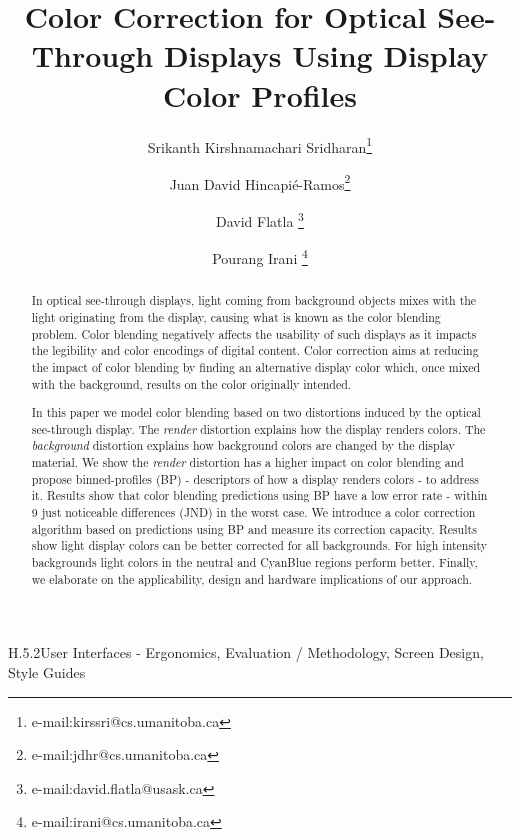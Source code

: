 \documentclass[annual]{acmsiggraph}
\title{Color Correction for Optical See-Through Displays
Using Display Color Profiles}
\author[1]{Srikanth Kirshnamachari Sridharan\thanks{e-mail:kirssri@cs.umanitoba.ca}}
\author[1]{Juan David Hincapi\'{e}-Ramos\thanks{e-mail:jdhr@cs.umanitoba.ca}}
\author[2]{David Flatla \thanks{e-mail:david.flatla@usask.ca}}
\author[1]{Pourang Irani  \thanks{e-mail:irani@cs.umanitoba.ca}}
\affil[1]{Department of Computer Science, Winnipeg, Manitoba, University Of Manitoba}
\affil[2]{Department of Computer Science, Saskatoon, Saskatchewan, University Of Saskatchewan}
\begin{document}

\maketitle

\begin{abstract}
In optical see-through displays, light coming from background objects mixes with the light originating from the display, causing what is known as the color blending problem. Color blending negatively affects the usability of such displays as it impacts the legibility and color encodings of digital content. Color correction aims at reducing the impact of color blending by finding an alternative display color which, once mixed with the background, results on the color originally intended.

In this paper we model color blending based on two distortions induced by the optical see-through display. The \textit{render} distortion explains how the display renders colors. The \textit{background} distortion explains how background colors are changed by the display material. We show the \textit{render} distortion has  a higher impact on color blending and propose binned-profiles (BP) - descriptors of how a display renders colors - to address it. Results show that color blending predictions using BP have a low error rate - within 9 just noticeable differences (JND) in the worst case. We introduce a color correction algorithm based on predictions using BP and measure its correction capacity. Results show light display colors can be better corrected for all backgrounds. For high intensity backgrounds light colors in the neutral and CyanBlue regions perform better. Finally, we elaborate on the applicability, design and hardware implications of our approach.
\end{abstract}

\begin{CRcatlist}
   {H.5.2}{User Interfaces - Ergonomics, Evaluation / Methodology, Screen Design, Style Guides}

\end{CRcatlist}

\keywordlist

\TOGlinkslist

\copyrightspace
\end{document}
